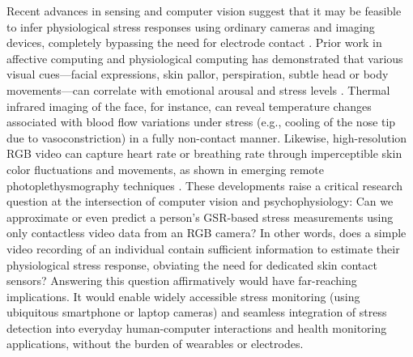 \documentclass[11pt,a4paper]{report}
\begin{document}
Recent advances in sensing and computer vision suggest that it may be feasible to infer physiological stress responses using ordinary cameras and imaging devices, completely bypassing the need for electrode contact \cite{Picard2001}. Prior work in affective computing and physiological computing has demonstrated that various visual cues—facial expressions, skin pallor, perspiration, subtle head or body movements—can correlate with emotional arousal and stress levels \cite{Healey2005}. Thermal infrared imaging of the face, for instance, can reveal temperature changes associated with blood flow variations under stress (e.g., cooling of the nose tip due to vasoconstriction) in a fully non-contact manner. Likewise, high-resolution RGB video can capture heart rate or breathing rate through imperceptible skin color fluctuations and movements, as shown in emerging remote photoplethysmography techniques \cite{Poh2010}. These developments raise a critical research question at the intersection of computer vision and psychophysiology: Can we approximate or even predict a person's GSR-based stress measurements using only contactless video data from an RGB camera? In other words, does a simple video recording of an individual contain sufficient information to estimate their physiological stress response, obviating the need for dedicated skin contact sensors? Answering this question affirmatively would have far-reaching implications. It would enable widely accessible stress monitoring (using ubiquitous smartphone or laptop cameras) and seamless integration of stress detection into everyday human-computer interactions and health monitoring applications, without the burden of wearables or electrodes.
\end{document}
